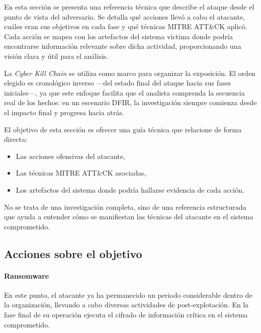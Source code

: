 En esta sección se presenta una referencia técnica que describe el ataque desde el punto de vista del adversario. Se detalla qué acciones llevó a cabo el atacante, cuáles eran sus objetivos en cada fase y qué técnicas MITRE ATT\&CK aplicó. Cada acción se mapea con los artefactos del sistema víctima donde podría encontrarse información relevante sobre dicha actividad, proporcionando una visión clara y útil para el análisis.

La \textit{Cyber Kill Chain} se utiliza como marco para organizar la exposición. El orden elegido es cronológico inverso —del estado final del ataque hacia sus fases iniciales—, ya que este enfoque facilita que el analista comprenda la secuencia real de los hechos: en un escenario DFIR, la investigación siempre comienza desde el impacto final y progresa hacia atrás.

El objetivo de esta sección es ofrecer una guía técnica que relacione de forma directa:
\begin{itemize}
    \item Las acciones ofensivas del atacante,
    \item Las técnicas MITRE ATT\&CK asociadas,
    \item Los artefactos del sistema donde podría hallarse evidencia de cada acción.
\end{itemize}

No se trata de una investigación completa, sino de una referencia estructurada que ayuda a entender cómo se manifiestan las técnicas del atacante en el sistema comprometido.

\subsection{Acciones sobre el objetivo}

\paragraph{Ransomware} En este punto, el atacante ya ha permanecido un periodo considerable dentro de la organización, llevando a cabo diversas actividades de post‑explotación. En la fase final de su operación ejecuta el cifrado de información crítica en el sistema comprometido.

